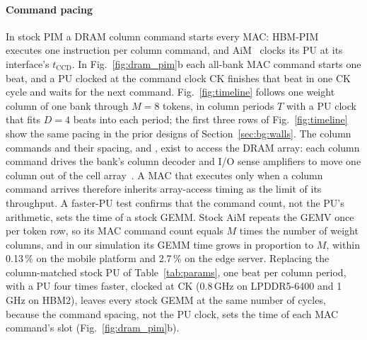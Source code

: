 \paragraph{Command pacing}
In stock PIM a DRAM column command starts every MAC: HBM-PIM~\cite{hbmpim} executes one instruction per column
command, and AiM~\cite{aimjssc} clocks its PU at its interface's $t_\mathrm{CCD}$. In Fig.~\ref{fig:dram_pim}b each all-bank
MAC command starts one beat, and a PU clocked at the command clock CK finishes that beat in one CK cycle and waits for the next command.
Fig.~\ref{fig:timeline} follows one weight column of one bank through $M = 8$ tokens, in column periods $T$ with a PU
clock that fits $D = 4$ beats into each period; the first three rows of Fig.~\ref{fig:timeline} show the same pacing in
the prior designs of Section~\ref{sec:bg:walls}. The column commands and their spacing,
\tccds{} and \tccdl, exist to access the DRAM array: each column command drives the bank's column decoder and I/O sense
amplifiers to move one column out of the cell array~\cite{hbmpim}. A MAC that executes only when a column command
arrives therefore inherits array-access timing as the limit of its throughput. A faster-PU test confirms that the
command count, not the PU's arithmetic, sets the time of a stock GEMM. Stock AiM repeats the GEMV once per token row,
so its MAC command count equals $M$ times the number of weight columns, and in our simulation its GEMM time grows in
proportion to $M$, within 0.13\,\% on the mobile platform and 2.7\,\% on the edge server. Replacing the column-matched
stock PU of Table~\ref{tab:params}, one beat per column period, with a PU four times faster, clocked at CK (0.8\,GHz on
LPDDR5-6400 and 1\,GHz on HBM2), leaves every stock GEMM at the same number of cycles, because the command spacing, not
the PU clock, sets the time of each MAC command's slot (Fig.~\ref{fig:dram_pim}b).

